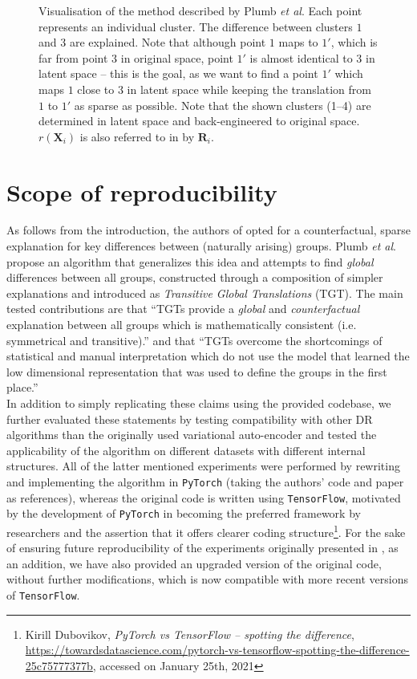\begin{figure}[h]
  \scalebox{0.8}{}
  \caption{Visualisation of the method described by Plumb \textit{et al}. Each point represents an individual cluster. The difference between clusters $1$ and $3$ are explained. Note that although point $1$ maps to $1'$, which is far from point $3$ in original space, point $1'$ is almost identical to $3$ in latent space -- this is the goal, as we want to find a point $1'$ which maps $1$ close to $3$ in latent space while keeping the translation from $1$ to $1'$ as sparse as possible. Note that the shown clusters (1--4) are determined in latent space and back-engineered to original space. $r(\boldsymbol{X}_i)$ is also referred to in \cite{plumb2020explaining} by $\boldsymbol{R}_i$.}
\end{figure}

\section{Scope of reproducibility}
As follows from the introduction, the authors of \cite{plumb2020explaining} opted for a counterfactual, sparse explanation for key differences between (naturally arising) groups. Plumb \textit{et al}. propose an algorithm that generalizes this idea and attempts to find \textit{global} differences between all groups, constructed through a composition of simpler explanations and introduced as \textit{Transitive Global Translations} (TGT). The main tested contributions are that ``TGTs provide a \textit{global} and \textit{counterfactual} explanation between all groups which is mathematically consistent (i.e. symmetrical and transitive).'' and that ``TGTs overcome the shortcomings of statistical and manual interpretation which do not use the model that learned the low dimensional representation that was used to define the groups in the first place.''\\

In addition to simply replicating these claims using the provided codebase, we further evaluated these statements by testing compatibility with other DR algorithms than the originally used variational auto-encoder and tested the applicability of the algorithm on different datasets with different internal structures. All of the latter mentioned experiments were performed by rewriting and implementing the algorithm in \texttt{PyTorch} (taking the authors' code and paper as references), whereas the original code is written using \texttt{TensorFlow}, motivated by the development of \texttt{PyTorch} in becoming the preferred framework by researchers \cite{he2019mlframeworks} and the assertion that it offers clearer coding structure\footnote{Kirill Dubovikov, \textit{PyTorch vs TensorFlow -- spotting the difference}, \url{https://towardsdatascience.com/pytorch-vs-tensorflow-spotting-the-difference-25c75777377b}, accessed on January 25th, 2021}. For the sake of ensuring future reproducibility of the experiments originally presented in \cite{plumb2020explaining}, as an addition, we have also provided an upgraded version of the original code, without further modifications, which is now compatible with more recent versions of \texttt{TensorFlow}.

